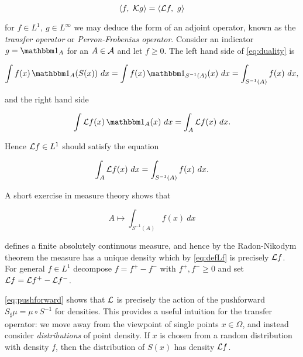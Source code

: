 \begin{equation}
    \label{eq:duality}
    \left\langle f,\ \mathcal{K} g \right\rangle = \left\langle \mathcal{L} f,\ g \right\rangle
\end{equation}

for $f \in L^1,\ g \in L^\infty$ we may deduce the form of an adjoint operator, known as 
the \emph{transfer operator} or \emph{Perron-Frobenius operator}. Consider an indicator 
$g = \bbone_A$ for an $A \in \mathcal{A}$ and let $f \geq 0$. The left hand side of 
\ref{eq:duality} is

\begin{equation}
    \int f (x) \, \bbone_A ( S (x) )\ dx 
    = \int f (x) \, \bbone_{S^{-1} (A)} (x)\ dx 
    = \int_{S^{-1} (A)} f (x)\ dx , 
\end{equation}

and the right hand side 

\begin{equation}
    \int \scrL f (x)\, \bbone_A (x)\ dx
    = \int_A \scrL f (x)\ dx . 
\end{equation}

Hence $\mathcal{L} f \in L^1$ should satisfy the equation 

\begin{equation}
    \label{eq:defLf}
    \int_A \mathcal{L} f (x)\ dx = \int_{S^{-1} (A)} f (x)\ dx . 
\end{equation}

A short exercise in measure theory shows that 

\begin{equation}
    \label{eq:pushforward}
    A \mapsto \int_{S^{-1} (A)} f (x)\ dx
\end{equation}

defines a finite absolutely continuous measure, and hence by the Radon-Nikodym theorem 
the measure has a unique density which by \ref{eq:defLf} is precisely $\mathcal{L} f$. For 
general $f \in L^1$ decompose $f = f^+ - f^-$ with $f^+, f^- \geq 0$ and set 
$\mathcal{L} f = \mathcal{L} f^+ - \mathcal{L} f^-$. 

\ref{eq:pushforward} shows that $\mathcal{L}$ is precisely the action of the pushforward 
$S_\sharp \mu = \mu \circ S^{-1}$ for densities. This provides a useful intuition for 
the transfer operator: we move away from the viewpoint of single points $x \in \Omega$, 
and instead consider \emph{distributions} of point density. If $x$ is 
chosen from a random distribution with density $f$, then the distribution of $S (x)$ has 
density $\mathcal{L} f$. 

